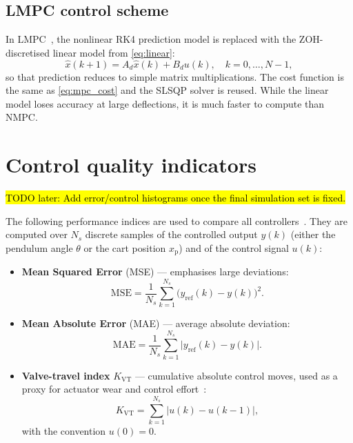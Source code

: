 \documentclass[twocolumn]{svjour3}
\begin{document}
\subsection{LMPC control scheme}

In LMPC~\cite{Jezierski2017}, the nonlinear RK4 prediction model is replaced with the ZOH-discretised linear model
from \eqref{eq:linear}:
\begin{equation}
\hat{x}(k+1) = A_d\hat{x}(k) + B_du(k),\quad k=0,\ldots,N{-}1,
\end{equation}
so that prediction reduces to simple matrix multiplications. The cost function is the same as
\eqref{eq:mpc_cost} and the SLSQP solver is reused. While the linear model loses accuracy at
large deflections, it is much faster to compute than NMPC.

\section{Control quality indicators}
\hl{TODO later: Add error/control histograms once the final simulation set is fixed.}

The following performance indices are used to compare all controllers~\cite{Nebeluk2024,Domanski2024}.
They are computed over $N_s$ discrete samples of the controlled output $y(k)$
(either the pendulum angle $\theta$ or the cart position $x_\mathrm{p}$) and of the
control signal $u(k)$:
\begin{itemize}
\item \textbf{Mean Squared Error} (MSE) --- emphasises large deviations:
\begin{equation}
\mathrm{MSE} = \frac{1}{N_s}\sum_{k=1}^{N_s}\bigl(y_\mathrm{ref}(k)-y(k)\bigr)^2.
\end{equation}
\item \textbf{Mean Absolute Error} (MAE) --- average absolute deviation:
\begin{equation}
\mathrm{MAE} = \frac{1}{N_s}\sum_{k=1}^{N_s}\bigl|y_\mathrm{ref}(k)-y(k)\bigr|.
\end{equation}
\item \textbf{Valve-travel index} $K_\mathrm{VT}$ --- cumulative absolute control moves,
used as a proxy for actuator wear and control effort~\cite{Domanski2024,Nebeluk2024}:
\begin{equation}
K_\mathrm{VT} = \sum_{k=1}^{N_s}\bigl|u(k)-u(k{-}1)\bigr|,
\end{equation}
with the convention $u(0)=0$.
\end{itemize}
\end{document}

